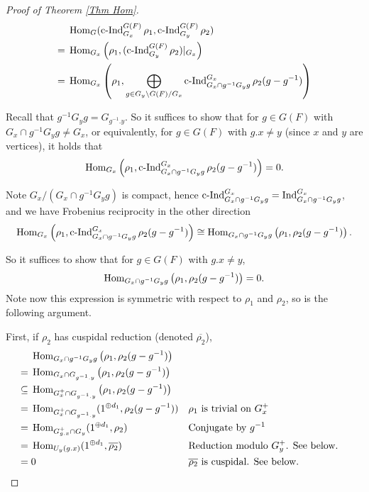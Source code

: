 	\begin{proof}[Proof of Theorem \ref{Thm Hom}]
		\begin{equation*}
			\begin{aligned}
				&\operatorname{\operatorname{Hom}}_G(\operatorname{\operatorname{c-Ind}}_{G_x}^{G(F)}\rho_1, \operatorname{\operatorname{c-Ind}}_{G_y}^{G(F)}\rho_2)\\
				=\;&\operatorname{\operatorname{Hom}}_{G_x}\left(\rho_1,(\operatorname{\operatorname{c-Ind}}_{G_y}^{G(F)}\rho_2)|_{G_x}\right)\\
				=\;& \operatorname{\operatorname{Hom}}_{G_x}\left(\rho_1, \bigoplus_{g \in {G_y\backslash G(F)/G_x}}\operatorname{\operatorname{c-Ind}}_{G_x \cap g^{-1}G_yg}^{G_x}\rho_2(g-g^{-1})\right)
			\end{aligned}
		\end{equation*}
		
		Recall that $g^{-1}G_yg=G_{g^{-1}.y}$. So it suffices to show that for $g \in G(F)$ with $G_x \cap g^{-1}G_yg \neq G_x$, or equivalently, for $g \in G(F)$ with $g.x \neq y$ (since $x$ and $y$ are vertices), it holds that
		$$\operatorname{\operatorname{Hom}}_{G_x}\left(\rho_1, \operatorname{\operatorname{c-Ind}}_{G_x \cap g^{-1}G_yg}^{G_x}\rho_2(g-g^{-1})\right)=0.$$
		
		Note $G_x/(G_x \cap g^{-1}G_yg)$ is compact, hence $\operatorname{\operatorname{c-Ind}}_{G_x \cap g^{-1}G_yg}^{G_x}=\operatorname{Ind}_{G_x \cap g^{-1}G_yg}^{G_x}$, and we have Frobenius reciprocity in the other direction
		$$\operatorname{\operatorname{Hom}}_{G_x}\left(\rho_1, \operatorname{\operatorname{c-Ind}}_{G_x \cap g^{-1}G_yg}^{G_x}\rho_2(g-g^{-1})\right) \cong \operatorname{\operatorname{Hom}}_{G_x \cap g^{-1}G_yg}\left(\rho_1, \rho_2(g-g^{-1})\right).$$
		
		So it suffices to show that for $g \in G(F)$ with $g.x \neq y$,
		$$\operatorname{\operatorname{Hom}}_{G_x \cap g^{-1}G_yg}\left(\rho_1, \rho_2(g-g^{-1})\right)=0.$$
		Note now this expression is symmetric with respect to $\rho_1$ and $\rho_2$, so is the following argument.
		
		First, if $\rho_2$ has cuspidal reduction (denoted $\overline{\rho_2}$),
		\begin{align*}    	
			& \Hom_{G_x \cap g^{-1}G_yg}\left(\rho_1, \rho_2(g-g^{-1})\right) \\
			=\;& \Hom_{G_x \cap G_{g^{-1}.y}}\left(\rho_1, \rho_2(g-g^{-1})\right) \\
			\subseteq\;& \Hom_{G_x^+ \cap G_{g^{-1}.y}}\left(\rho_1, \rho_2(g-g^{-1})\right) && %
			\\
			=\;& \Hom_{G_x^+ \cap G_{g^{-1}.y}}(1^{\oplus d_1}, \rho_2(g-g^{-1})) && \text{$\rho_1$ is trivial on $G_x^+$ }\\
			=\;& \Hom_{G_{g.x}^+ \cap G_y}(1^{\oplus d_1}, \rho_2) && \text{Conjugate by $g^{-1}$}\\
			=\;& \Hom_{U_y(g.x)}(1^{\oplus d_1}, \overline{\rho_2}) && \text{Reduction modulo $G_y^+$. See below.}\\
			=\;& 0 && \text{$\overline{\rho_2}$ is cuspidal. See below.}
		\end{align*}
		

\end{proof}
